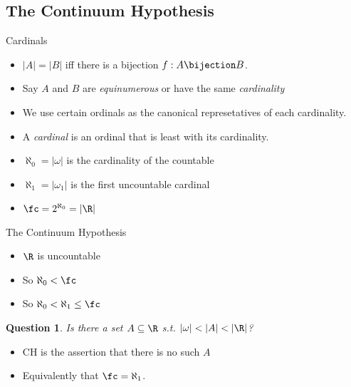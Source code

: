 \documentclass{beamer}
\newtheorem*{question}{Question}
\begin{document}
\subsection{The Continuum Hypothesis}

\begin{frame}{Cardinals}

\begin{definition}
\begin{itemize}
  \item $|A| = |B|$ iff there is a bijection $f:A\bijection B$.
  \item Say $A$ and $B$ are \emph{equinumerous} or have the same \emph{cardinality}
  \item We use certain ordinals as the canonical represetatives of each cardinality.
  \item A \emph{cardinal} is an ordinal that is least with its cardinality.
  \item  $\aleph_0 = |\omega|$ is the cardinality of the countable
  \item  $\aleph_1 = |\omega_1|$ is the first uncountable cardinal
  \item $\fc  = 2^{\aleph_0} = |\R|$
\end{itemize}

\end{definition}

\end{frame}

\begin{frame}{The Continuum Hypothesis}

\begin{fact}
\begin{itemize}
  \item $\R$ is uncountable
  \item So $\aleph_0 < \fc$
  \item So $\aleph_0 < \aleph_1 \leq \fc$
\end{itemize}
\end{fact}

\begin{question}
Is there a set $A \subseteq \R$ s.t. $|\omega| < |A| < |\R|$?
\end{question}

\begin{definition}
\begin{itemize}
  \item CH is the assertion that there is no such $A$
  \item Equivalently that $\fc = \aleph_1$.
\end{itemize}
\end{definition}

\end{frame}
\end{document}
